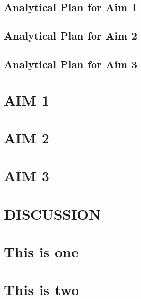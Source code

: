 \documentclass[12pt]{book}
\numberwithin{equation}{chapter}
\begin{document}
\hypertarget{analytical-plan-for-aim-1}{%
\section{Analytical Plan for Aim 1}\label{analytical-plan-for-aim-1}}

\hypertarget{analytical-plan-for-aim-2}{%
\section{Analytical Plan for Aim 2}\label{analytical-plan-for-aim-2}}

\hypertarget{analytical-plan-for-aim-3}{%
\section{Analytical Plan for Aim 3}\label{analytical-plan-for-aim-3}}

\hypertarget{aim-1}{%
\chapter{AIM 1}\label{aim-1}}

\hypertarget{aim-2}{%
\chapter{AIM 2}\label{aim-2}}

\hypertarget{aim-3}{%
\chapter{AIM 3}\label{aim-3}}

\hypertarget{discussion}{%
\chapter{DISCUSSION}\label{discussion}}

\cleardoublepage




\cleardoublepage

\hypertarget{appendix-appendix}{%
\appendix}


\hypertarget{this-is-one}{%
\chapter{This is one}\label{this-is-one}}

\hypertarget{this-is-two}{%
\chapter{This is two}\label{this-is-two}}







\backmatter
\printindex
\end{document}
